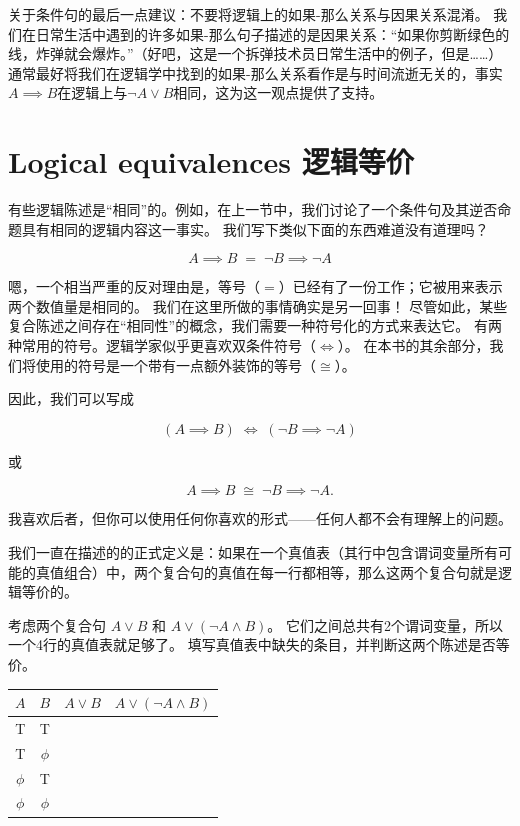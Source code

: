 关于条件句的最后一点建议：不要将逻辑上的如果-那么关系与因果关系混淆。
我们在日常生活中遇到的许多如果-那么句子描述的是因果关系：“如果你剪断绿色的线，炸弹就会爆炸。”（好吧，这是一个拆弹技术员日常生活中的例子，但是……）通常最好将我们在逻辑学中找到的如果-那么关系看作是与时间流逝无关的，事实$A \implies B$在逻辑上与${\lnot}A \lor B$相同，这为这一观点提供了支持。

\newpage




\newpage

\section{Logical equivalences 逻辑等价}
\label{sec:le}

有些逻辑陈述是“相同”的。例如，在上一节中，我们讨论了一个条件句及其逆否命题具有相同的逻辑内容这一事实。
我们写下类似下面的东西难道没有道理吗？

\[ A \implies B \; = \; {\lnot}B \implies {\lnot}A \]

嗯，一个相当严重的反对理由是，等号（$=$）已经有了一份工作；它被用来表示两个数值量是相同的。
我们在这里所做的事情确实是另一回事！
尽管如此，某些复合陈述之间存在“相同性”的概念，我们需要一种符号化的方式来表达它。
有两种常用的符号。逻辑学家似乎更喜欢双条件符号（$\iff$）。
在本书的其余部分，我们将使用的符号是一个带有一点额外装饰的等号（$\cong$）。

因此，我们可以写成

\[ (A \implies B) \; \iff \; ({\lnot}B \implies {\lnot}A) \]

\noindent 或

\[ A \implies B \; \cong \; {\lnot}B \implies {\lnot}A. \]


\noindent 我喜欢后者，但你可以使用任何你喜欢的形式——任何人都不会有理解上的问题。

我们一直在描述的的正式定义是：如果在一个真值表（其行中包含谓词变量所有可能的真值组合）中，两个复合句的真值在每一行都相等，那么这两个复合句就是逻辑等价的。

\begin{exer} 
考虑两个复合句 $A \lor B$ 和 $A \lor ({\lnot}A \land B)$。
它们之间总共有2个谓词变量，所以一个4行的真值表就足够了。
填写真值表中缺失的条目，并判断这两个陈述是否等价。
\begin{center}
\begin{tabular}{c|c||c|c}
\; $A$ \; & \; $B$ \; & \; $A \lor B$ \; & \; $A \lor ({\lnot}A \land B)$\; \\ \hline
T & T &  & \\
T & $\phi$ & & \\
 $\phi$ & T & &  \\
 $\phi$ &  $\phi$  & &\\
\end{tabular}
\end{center}

\end{exer}

